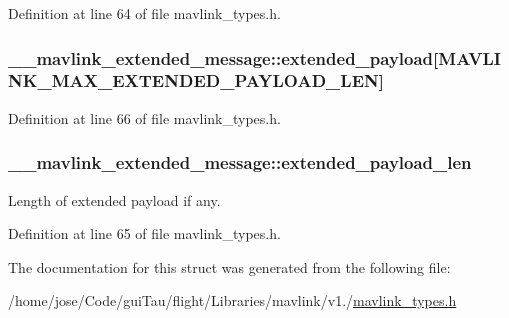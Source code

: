 Definition at line 64 of file mavlink\-\_\-types.\-h.

\hypertarget{struct____mavlink__extended__message_afccf6dc3341050b0a63ac0d069d66a31}{
\subsubsection[{extended\-\_\-payload}]{ \-\_\-\-\_\-mavlink\-\_\-extended\-\_\-message\-::extended\-\_\-payload\mbox{[}M\-A\-V\-L\-I\-N\-K\-\_\-\-M\-A\-X\-\_\-\-E\-X\-T\-E\-N\-D\-E\-D\-\_\-\-P\-A\-Y\-L\-O\-A\-D\-\_\-\-L\-E\-N\mbox{]}}}\label{struct____mavlink__extended__message_afccf6dc3341050b0a63ac0d069d66a31}


Definition at line 66 of file mavlink\-\_\-types.\-h.

\hypertarget{struct____mavlink__extended__message_a7fcf54d2c29dc157a78caacae8d998cf}{
\subsubsection[{extended\-\_\-payload\-\_\-len}]{ \-\_\-\-\_\-mavlink\-\_\-extended\-\_\-message\-::extended\-\_\-payload\-\_\-len}}\label{struct____mavlink__extended__message_a7fcf54d2c29dc157a78caacae8d998cf}


Length of extended payload if any. 



Definition at line 65 of file mavlink\-\_\-types.\-h.



The documentation for this struct was generated from the following file\-:\begin{DoxyCompactItemize}
\item 
/home/jose/\-Code/gui\-Tau/flight/\-Libraries/mavlink/v1./\hyperlink{mavlink__types_8h}{mavlink\-\_\-types.\-h}\end{DoxyCompactItemize}
